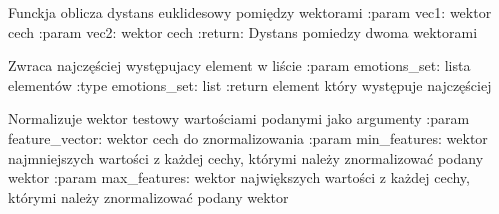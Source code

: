 \documentclass[letterpaper,10pt,polish]{sphinxmanual}
\begin{document}

\begin{fulllineitems}
\label{\detokenize{helper_file:helper_file.euclidean_distance}}
Funckja oblicza dystans euklidesowy pomiędzy wektorami
:param vec1: wektor cech
:param vec2: wektor cech
:return: Dystans pomiedzy dwoma wektorami

\end{fulllineitems}


\begin{fulllineitems}
\label{\detokenize{helper_file:helper_file.get_most_frequently_occurring}}
Zwraca najczęściej występujacy element w liście
:param emotions\_set: lista elementów
:type emotions\_set: list
:return element który występuje najczęściej

\end{fulllineitems}


\begin{fulllineitems}
\label{\detokenize{helper_file:helper_file.normalize_vector}}
Normalizuje wektor testowy wartościami podanymi jako argumenty
:param feature\_vector: wektor cech do znormalizowania
:param min\_features: wektor najmniejszych wartości z każdej cechy, którymi należy znormalizować podany wektor
:param max\_features: wektor największych wartości z każdej cechy, którymi należy znormalizować podany wektor

\end{fulllineitems}


\begin{fulllineitems}
\label{\detokenize{helper_file:helper_file.print_debug}}
\end{fulllineitems}

\end{document}
